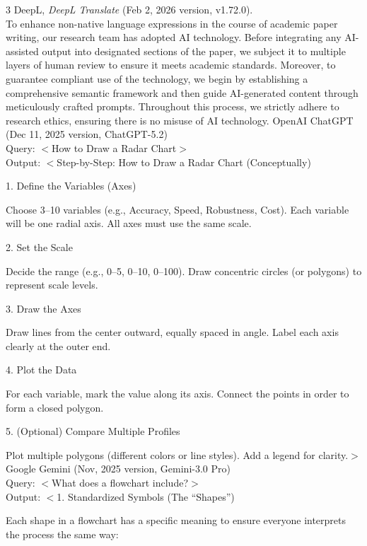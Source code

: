 \documentclass{mcmthesis}
\begin{document}
\newpage
{}
\AImatter
\begin{ReportAiUse}{3}
DeepL, \textit{DeepL Translate} (Feb 2, 2026 version, v1.72.0).\\
To enhance non-native language expressions in the course of academic paper writing, our research team has adopted AI technology. Before integrating any AI-assisted output into designated sections of the paper, we subject it to multiple layers of human review to ensure it meets academic standards. Moreover, to guarantee compliant use of the technology, we begin by establishing a comprehensive semantic framework and then guide AI-generated content through meticulously crafted prompts. Throughout this process, we strictly adhere to research ethics, ensuring there is no misuse of AI technology.
OpenAI ChatGPT (Dec 11, 2025 version, ChatGPT-5.2)\\
Query: $<$How to Draw a Radar Chart$>$\\
Output: $<$Step-by-Step: How to Draw a Radar Chart (Conceptually)

1. Define the Variables (Axes)

Choose 3--10 variables (e.g., Accuracy, Speed, Robustness, Cost). Each variable will be one radial axis. All axes must use the same scale.

2. Set the Scale

Decide the range (e.g., 0--5, 0--10, 0--100). Draw concentric circles (or polygons) to represent scale levels.

3. Draw the Axes

Draw lines from the center outward, equally spaced in angle. Label each axis clearly at the outer end.

4. Plot the Data

For each variable, mark the value along its axis. Connect the points in order to form a closed polygon.

5. (Optional) Compare Multiple Profiles

Plot multiple polygons (different colors or line styles). Add a legend for clarity.$>$\\

Google Gemini (Nov, 2025 version, Gemini-3.0 Pro)\\
Query: $<$What does a flowchart include?$>$\\
Output: $<$1. Standardized Symbols (The ``Shapes'')

Each shape in a flowchart has a specific meaning to ensure everyone interprets the process the same way:


\end{ReportAiUse}
\end{document}
